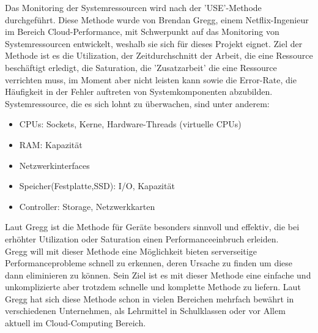 \documentclass[a4paper,10pt]{scrartcl}
\begin{document}
Das Monitoring der Systemressourcen wird nach der 'USE'-Methode durchgeführt. Diese Methode wurde von Brendan Gregg, einem Netflix-Ingenieur im Bereich Cloud-Performance, mit Schwerpunkt auf das Monitoring von Systemressourcen entwickelt, weshalb sie sich für dieses Projekt eignet.
Ziel der Methode ist es die Utilization, der Zeitdurchschnitt der Arbeit, die eine Ressource beschäftigt erledigt, die Saturation, die 'Zusatzarbeit' die eine Ressource verrichten muss, im Moment aber nicht leisten kann sowie die Error-Rate, die Häufigkeit in der Fehler auftreten von Systemkomponenten abzubilden.\\
Systemressource, die es sich lohnt zu überwachen, sind unter anderem:\\

\begin{itemize}
\item CPUs: Sockets, Kerne, Hardware-Threads (virtuelle CPUs)
\item RAM: Kapazität
\item Netzwerkinterfaces
\item Speicher(Festplatte,SSD): I/O, Kapazität
\item Controller: Storage, Netzwerkkarten
\end{itemize}

Laut Gregg ist die Methode für Geräte besonders sinnvoll und effektiv, die bei erhöhter Utilization oder Saturation einen Performanceeinbruch erleiden.\\

Gregg will mit dieser Methode eine Möglichkeit bieten serverseitige Performanceprobleme schnell zu erkennen, deren Ursache zu finden um diese dann eliminieren zu können. Sein Ziel ist es mit dieser Methode eine einfache und unkomplizierte aber trotzdem schnelle und komplette Methode zu liefern. Laut Gregg hat sich diese Methode schon in vielen Bereichen mehrfach bewährt in verschiedenen Unternehmen, als Lehrmittel in Schulklassen oder vor Allem aktuell im Cloud-Computing Bereich.\\
\end{document}
